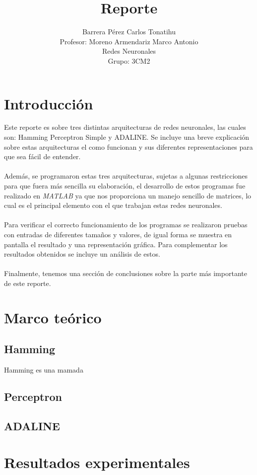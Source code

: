 \documentclass[12pt, titlepage]{article}
\title{Reporte}
\author{Barrera Pérez Carlos Tonatihu \\ Profesor: Moreno Armendariz Marco Antonio \\ Redes Neuronales \\ Grupo: 3CM2 }
\begin{document}
    \maketitle
    \tableofcontents
    \newpage
    \section{Introducción}
        Este reporte es sobre tres distintas arquitecturas de redes neuronales, las cuales son: Hamming Perceptron Simple y ADALINE. Se incluye una breve explicación sobre estas arquitecturas el como funcionan y sus diferentes representaciones para que sea fácil de entender.
        \\\\
        Además, se programaron estas tres arquitecturas, sujetas a algunas restricciones para que fuera más sencilla su elaboración, el desarrollo de estos programas fue realizado en \emph{MATLAB} ya que nos proporciona un manejo sencillo de matrices, lo cual es el principal elemento con el que trabajan estas redes neuronales. 
        \\\\
        Para verificar el correcto funcionamiento de los programas se realizaron pruebas con entradas de diferentes tamaños y valores, de igual forma se muestra en pantalla el resultado y una representación gráfica. Para complementar los resultados obtenidos se incluye un análisis de estos.
        \\\\
        Finalmente, tenemos una sección de conclusiones sobre la parte más importante de este reporte.
    \section{Marco teórico}
        \subsection{Hamming}
        Hamming es una mamada \cite{libro1}
        \subsection{Perceptron}
        \subsection{ADALINE}
    \section{Resultados experimentales}
\end{document}
